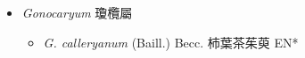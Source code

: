 
  \begin{itemize}
 \item[] \textit{Gonocaryum} 瓊欖屬
                                
  \begin{itemize}
        \item[] \textit{G. calleryanum} (Baill.) Becc.  柿葉茶茱萸   EN*
  \end{itemize}
  \end{itemize}
